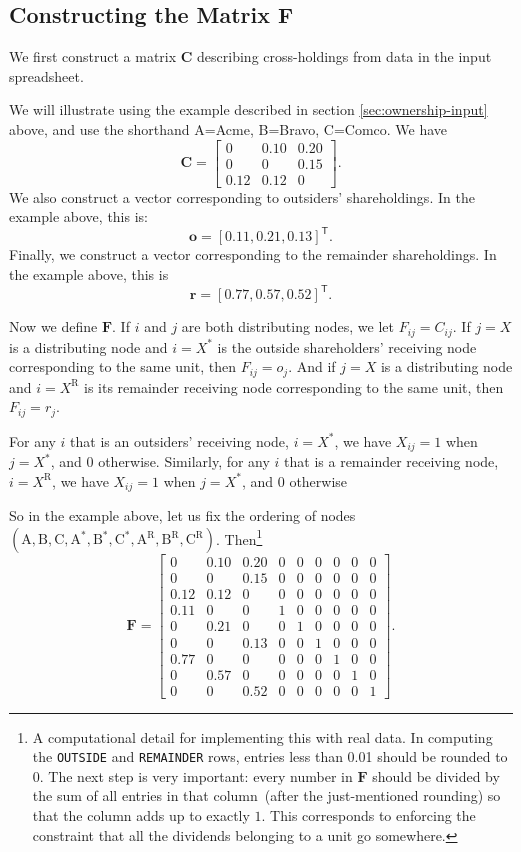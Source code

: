 \documentclass[a4paper,12pt,reqno]{amsart}
\newcommand{\tr}{\mathsf{T}}
\theoremstyle{definition} \newtheorem{example}{Example}
\theoremstyle{definition} \newtheorem{condition}{Condition}
\theoremstyle{definition} \newtheorem{corollary}{Corollary}
\theoremstyle{definition} \newtheorem{claim}{Claim}
\theoremstyle{definition} \newtheorem{definition}{Definition}
\theoremstyle{definition} \newtheorem{conjecture}{Conjecture}
\theoremstyle{definition} \newtheorem{lemma}{Lemma}
\theoremstyle{definition} \newtheorem{theorem}{Theorem}
\theoremstyle{definition} \newtheorem*{theoremNoNumber}{Theorem}
\theoremstyle{definition} \newtheorem*{lemmaCorrespondence}{Lemma \ref{lem:correspondence}}
\theoremstyle{definition}\newtheorem{proposition}{Proposition}
\theoremstyle{definition} \newtheorem{result}{Result}
\theoremstyle{definition} \newtheorem*{definitionNoNumber}{Definition}
\theoremstyle{definition} \newtheorem{assumption}{Assumption}
\theoremstyle{definition} \newtheorem*{assumptionNoNumber}{Assumption}
\theoremstyle{definition} \newtheorem*{fact}{Fact}
\theoremstyle{definition} \newtheorem*{property}{Property}
\theoremstyle{definition} \newtheorem{remark}{Remark}
\begin{document}
\subsection{Constructing the Matrix $\mathbf{F}$}  \label{sec:constructing-F} We first construct a matrix $\mathbf{C}$ describing cross-holdings from data in the input spreadsheet. 

We will illustrate using the example described in section  \ref{sec:ownership-input} above, and use the shorthand A=Acme, B=Bravo, C=Comco. We have $$ \mathbf{C} = \left[ \begin{array}{ccc} 0 & 0.10 & 0.20 \\ 0 & 0 & 0.15 \\ 0.12 & 0.12 & 0\end{array} \right].$$ We also construct a vector corresponding to outsiders' shareholdings. In the example above, this is: $$ \mathbf{o}= [0.11, 0.21, 0.13 ]^\tr.$$    Finally, we construct a vector corresponding to the remainder shareholdings. In the example above, this is $$ \mathbf{r}= [0.77, 0.57, 0.52 ]^\tr.$$

Now we define $\mathbf{F}$. If $i$ and $j$ are both distributing nodes, we let $F_{ij}=C_{ij}$. If $j=X$ is a distributing node and $i=X^*$ is the outside shareholders' receiving node corresponding to the same unit, then $F_{ij}=o_j$. And if $j=X$ is a distributing node and $i=X^\text{R}$ is its remainder receiving node corresponding to the same unit, then $F_{ij} = r_j $. 

For any $i$ that is an outsiders' receiving node, $i=X^*$, we have $X_{ij}=1$ when $j=X^*$, and $0$ otherwise. Similarly, for any $i$ that is a remainder receiving node, $i=X^\text{R}$, we have $X_{ij}=1$ when $j=X^*$, and $0$ otherwise 

So in the example above, let us fix the ordering of nodes $(\text{A},\text{B}, \text{C},\text{A}^*,\text{B}^*, \text{C}^*, \text{A}^\text{R},\text{B}^\text{R}, \text{C}^\text{R})$. Then\footnote{A computational detail for implementing this with real data. In computing the {\tt OUTSIDE} and {\tt REMAINDER} rows, entries less than 0.01 should be rounded to 0. The next step is very important: every number in $\mathbf{F}$ should be divided by the sum of all entries in that column\ (after the just-mentioned rounding) so that the column adds up to exactly $1$. This corresponds to enforcing the constraint that all the dividends belonging to a unit go somewhere. }
$$ \mathbf{F} = \left[ \begin{array}{ccc|ccc|ccc} 0 & 0.10 & 0.20 & 0&0 &0 & 0 & 0 &0  \\ 0 & 0 & 0.15 & 0&0 &0 & 0 & 0 &0  \\ 0.12 & 0.12 & 0& 0&0 &0 & 0 & 0 &0  \\ \hline  0.11 & 0 & 0 & 1&0 &0 & 0 & 0 &0  \\ 0 & 0.21 & 0 & 0&1 &0 & 0 & 0 &0  \\ 0 & 0 & 0.13& 0&0 &1 & 0 & 0 &0 \\ \hline  0.77 & 0 & 0 & 0&0 &0 & 1 & 0 &0  \\ 0 & 0.57 & 0 & 0&0 &0 & 0 & 1 &0  \\ 0 & 0 & 0.52& 0&0 &0 & 0 & 0 &1\end{array} \right].$$
\end{document}
